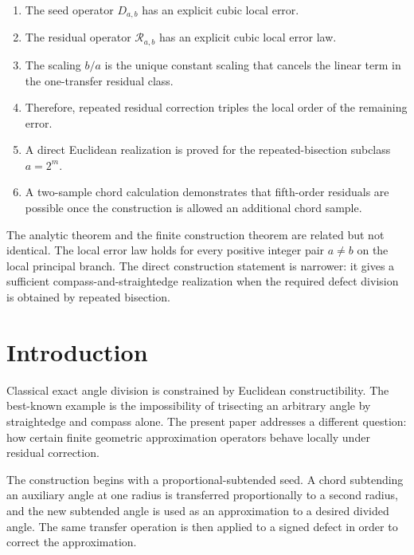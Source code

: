 \documentclass[11pt]{article}
\theoremstyle{definition}
\theoremstyle{remark}
\newcommand{\Rop}{\mathscr{R}}
\begin{document}
\begin{enumerate}[label=\arabic*.]
\item The seed operator $D_{a,b}$ has an explicit cubic local error.

\item The residual operator $\Rop_{a,b}$ has an explicit cubic local error law.

\item The scaling $b/a$ is the unique constant scaling that cancels the linear
term in the one-transfer residual class.

\item Therefore, repeated residual correction triples the local order of the
remaining error.

\item A direct Euclidean realization is proved for the repeated-bisection
subclass $a=2^m$.

\item A two-sample chord calculation demonstrates that fifth-order residuals
are possible once the construction is allowed an additional chord sample.
\end{enumerate}

The analytic theorem and the finite construction theorem are related but not
identical.  The local error law holds for every positive integer pair $a\ne b$
on the local principal branch.  The direct construction statement is narrower:
it gives a sufficient compass-and-straightedge realization when the required
defect division is obtained by repeated bisection.

\section{Introduction}
\label{sec:introduction}

Classical exact angle division is constrained by Euclidean constructibility.
The best-known example is the impossibility of trisecting an arbitrary angle
by straightedge and compass alone.  The present paper addresses a different
question: how certain finite geometric approximation operators behave locally
under residual correction.

The construction begins with a proportional-subtended seed.  A chord
subtending an auxiliary angle at one radius is transferred proportionally to a
second radius, and the new subtended angle is used as an approximation to a
desired divided angle.  The same transfer operation is then applied to a
signed defect in order to correct the approximation.
\end{document}
